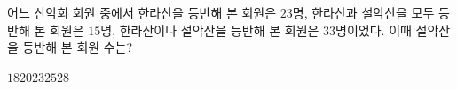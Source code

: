 어느 산악회 회원 중에서 한라산을 등반해 본 회원은 $23$명, 한라산과 설악산을 모두 등반해 본 회원은 $15$명, 한라산이나 설악산을 등반해 본 회원은 $33$명이었다. 이때 설악산을 등반해 본 회원 수는?
\begin{choices32}{$18$}{$20$}{$23$}{$25$}{$28$}\end{choices32}
